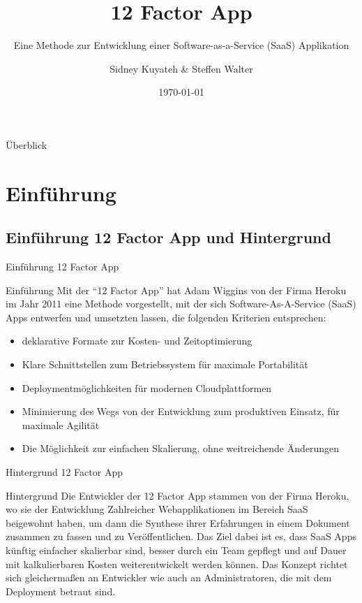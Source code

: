 \documentclass{beamer}
\title{12 Factor App}
\subtitle{Eine Methode zur Entwicklung einer Software-as-a-Service (SaaS) Applikation}
\author{Sidney Kuyateh \& Steffen Walter}
\institute{Duale Hochschule Baden-Württemberg}
\date{\today}
\begin{document}
	\maketitle
	\begin{frame}{Überblick}
		\scriptsize
		\setlength{\baselineskip}{7pt}
		\vspace{0.3cm}
		\tableofcontents
		\vfill
	\end{frame}
		\section{Einführung}
			\subsection{Einführung 12 Factor App und Hintergrund}
				\begin{frame}{Einführung 12 Factor App}
					\begin{block}{Einführung}
						Mit der \enquote{12 Factor App} hat Adam Wiggins von der Firma Heroku im Jahr 2011 eine Methode vorgestellt, mit der sich Software-As-A-Service (SaaS) Apps entwerfen und umsetzten lassen, die folgenden Kriterien entsprechen:
						\begin{itemize}
							\item deklarative Formate zur Kosten- und Zeitoptimierung
							\item Klare Schnittstellen zum Betriebssystem für maximale Portabilität
							\item Deploymentmöglichkeiten für modernen Cloudplattformen
							\item Minimierung des Wegs von der Entwicklung zum produktiven Einsatz, für maximale Agilität
							\item Die Möglichkeit zur einfachen Skalierung, ohne weitreichende Änderungen
						\end{itemize}
					\end{block}
				\end{frame}
				\begin{frame}{Hintergrund 12 Factor App}
					\begin{block}{Hintergrund}
						Die Entwickler der 12 Factor App stammen von der Firma Heroku, wo sie der Entwicklung Zahlreicher Webapplikationen im Bereich SaaS beigewohnt haben, um dann die Synthese ihrer Erfahrungen in einem Dokument zusammen zu fassen und zu Veröffentlichen.\newline
						Das Ziel dabei ist es, dass SaaS Apps künftig einfacher skalierbar sind, besser durch ein Team gepflegt und auf Dauer mit kalkulierbaren Kosten weiterentwickelt werden können. Das Konzept richtet sich gleichermaßen an Entwickler wie auch an Administratoren, die mit dem Deployment betraut sind.
					\end{block}
				\end{frame}
\end{document}
